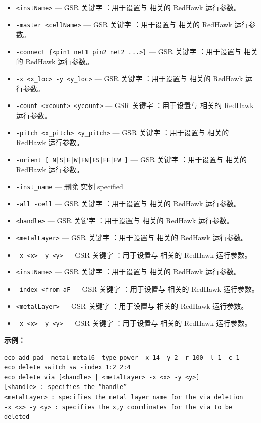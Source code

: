\begin{itemize}
\item \texttt{<instName>} — GSR 关键字 ：用于设置与  相关的 RedHawk 运行参数。
\item \texttt{-master <cellName>} — GSR 关键字 ：用于设置与  相关的 RedHawk 运行参数。
\item \texttt{-connect \{<pin1 net1 pin2 net2 ...>\}} — GSR 关键字 ：用于设置与  相关的 RedHawk 运行参数。
\item \texttt{-x <x\_loc> -y <y\_loc>} — GSR 关键字 ：用于设置与  相关的 RedHawk 运行参数。
\item \texttt{-count <xcount> <ycount>} — GSR 关键字 ：用于设置与  相关的 RedHawk 运行参数。
\item \texttt{-pitch <x\_pitch> <y\_pitch>} — GSR 关键字 ：用于设置与  相关的 RedHawk 运行参数。
\item \texttt{-orient [ N|S|E|W|FN|FS|FE|FW ]} — GSR 关键字 ：用于设置与  相关的 RedHawk 运行参数。
\item \texttt{-inst\_name} — 删除 实例 specified
\item \texttt{-all -cell} — GSR 关键字 ：用于设置与  相关的 RedHawk 运行参数。
\item \texttt{<handle>} — GSR 关键字 ：用于设置与  相关的 RedHawk 运行参数。
\item \texttt{<metalLayer>} — GSR 关键字 ：用于设置与  相关的 RedHawk 运行参数。
\item \texttt{-x <x> -y <y>} — GSR 关键字 ：用于设置与  相关的 RedHawk 运行参数。
\item \texttt{<instName>} — GSR 关键字 ：用于设置与  相关的 RedHawk 运行参数。
\item \texttt{-index <from\_aF} — GSR 关键字 ：用于设置与  相关的 RedHawk 运行参数。
\item \texttt{<metalLayer>} — GSR 关键字 ：用于设置与  相关的 RedHawk 运行参数。
\item \texttt{-x <x> -y <y>} — GSR 关键字 ：用于设置与  相关的 RedHawk 运行参数。
\end{itemize}

\textbf{示例：}
\begin{lstlisting}
eco add pad -metal metal6 -type power -x 14 -y 2 -r 100 -l 1 -c 1
eco delete switch sw -index 1:2 2:4
eco delete via [<handle> | <metalLayer> -x <x> -y <y>]
[<handle> : specifies the “handle”
<metalLayer> : specifies the metal layer name for the via deletion
-x <x> -y <y> : specifies the x,y coordinates for the via to be deleted
\end{lstlisting}

\subsection{}
